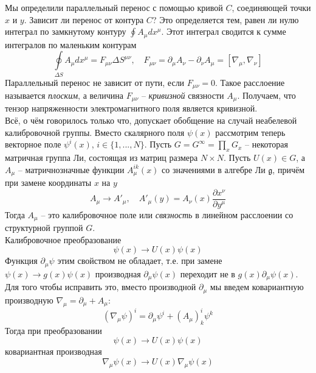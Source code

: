 \documentclass[12pt]{article}
\theoremstyle{definition}
\begin{document}
Мы определили параллельный перенос с помощью кривой $C$, соединяющей точки $x$ и $y$. Зависит ли перенос от контура $C$? Это определяется тем, равен ли нулю интеграл по замкнутому контуру $\oint A_\mu dx^\mu$. Этот интеграл сводится к сумме интегралов по маленьким контурам
\begin{equation}
    \oint\limits_{\Delta S}A_\mu dx^\mu=F_{\mu\nu}\Delta S^{\mu\nu},\quad F_{\mu\nu}=\partial_\mu A_\nu-\partial_\nu A_\mu=[\nabla_\mu,\nabla_\nu]
\end{equation}
Параллельный перенос не зависит от пути, если $F_{\mu\nu} = 0$. Такое расслоение называется \textit{плоским}, а величина $F_{\mu\nu}$ -- \textit{кривизной} связности $A_\mu$. Получаем, что тензор напряженности электромагнитного поля является кривизной.\\
Всё, о чём говорилось только что, допускает обобщение на случай неабелевой калибровочной группы. Вместо скалярного поля $\psi(x)$ рассмотрим теперь векторное поле $\psi^i(x)$, $i\in\{1,...,N\}$. Пусть $G=G^\infty=\prod\limits_x G_x$ -- некоторая матричная группа Ли, состоящая из матриц размера $N\times N$. Пусть $U(x)\in G$, а $A_\mu$ -- матричнозначные функции $A^{ik}_\mu(x)$ со значениями в алгебре Ли $\mathfrak{g}$, причём при замене координаты $x$ на $y$
\begin{equation}
    A_\mu\rightarrow A'_\mu,\quad A'_\mu(y)=A_\nu(x)\frac{\partial x^\nu}{\partial y^\mu}
\end{equation}
Тогда $A_\mu$ -- это калибровочное поле или \textit{связность} в линейном расслоении со структурной группой $G$.\\
Калибровочное преобразование 
\begin{equation}
    \psi(x)\rightarrow U(x)\psi(x)
\end{equation}
Функция $\partial_\mu\psi$ этим свойством не обладает, т.е. при замене $\psi(x)\rightarrow g(x)\psi(x)$ производная $\partial_\mu\psi(x)$ переходит не в $g(x)\partial_\mu\psi(x)$. Для того чтобы исправить это, вместо производной $\partial_\mu$ мы введем ковариантную производную $\nabla_\mu=\partial_\mu+A_\mu$:
\begin{equation}
    (\nabla_\mu\psi)^i=\partial_\mu\psi^i+(A_\mu)^i_k\psi^k
\end{equation}
Тогда при преобразовании
\begin{equation}
    \psi(x)\rightarrow U(x)\psi(x)
\end{equation}
ковариантная производная 
\begin{equation}
    \nabla_\mu\psi(x)\rightarrow U(x)\nabla_\mu\psi(x)
\end{equation}
\end{document}
